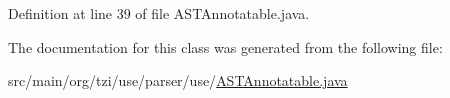 Definition at line 39 of file A\-S\-T\-Annotatable.\-java.



The documentation for this class was generated from the following file\-:\begin{DoxyCompactItemize}
\item 
src/main/org/tzi/use/parser/use/\hyperlink{_a_s_t_annotatable_8java}{A\-S\-T\-Annotatable.\-java}\end{DoxyCompactItemize}
